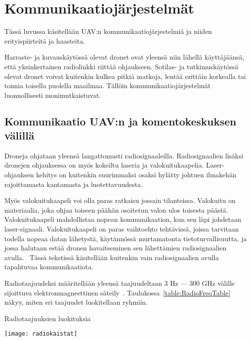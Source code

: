 \chapter{Kommunikaatiojärjestelmät}
\label{ch:kommunikaatio}

Tässä luvussa käsitellään UAV:n kommunikaatiojärjestelmiä ja niiden
erityispiirteitä ja haasteita.

Harraste- ja kuvauskäytössä olevat dronet ovat yleensä niin lähellä
käyttäjäänsä, että yksinkertainen radiolinkki riittää ohjaukseen. Sotilas- ja
tutkimuskäytössä olevat dronet voivat kuitenkin kulkea pitkiä matkoja, lentää
erittäin korkealla tai toimia toisella puolella maailmaa. Tällöin
kommunikaatiojärjestelmät luonnollisesti monimutkaistuvat.

\section{Kommunikaatio UAV:n ja komentokeskuksen välillä}

Droneja ohjataan yleensä langattomasti radiosignaaleilla. Radiosignaalien
lisäksi dronejen ohjauksessa on myös kokeiltu laseria ja valokuitukaapelia.
Laser-ohjauksen kehitys on kuitenkin suurimmaksi osaksi hylätty johtuen
ilmakehän rajoittamasta kantamasta ja luotettavuudesta.

Myös valokuitukaapeli voi olla paras ratkaisu jossain tilanteissa.  Valokuitu
on materiaalia, joka ohjaa toiseen päähän osoitetun valon ulos toisesta päästä.
Valokuitukaapeli mahdollistaa nopean kommunikaation, kun sen läpi johdetaan
laser-signaali.  Valokuitukaapeli on paras vaihtoehto tehtävissä, joissa
tarvitaan todella nopeaa datan lähetystä, käytännössä murtamatonta
tietoturvallisuutta, ja jossa halutaan estää dronen havaitseminen sen
lähettämien radiosignaalien avulla.~\cite{Austin2010} Tässä tekstissä
käsitellään kuitenkin vain radiosignaalien avulla tapahtuvaa kommunikaatiota.

Radiotaajuudeksi määritellään yleensä taajuudeltaan 3 Hz --- 300 GHz välille
sijoittuva elektronmagneettinen säteily~\cite{Sobot2012}.
Taulukossa~\ref{table:RadioFreqTable} näkyy, miten eri taajuudet luokitellaan
ryhmiin.
\begin{table}[H]
  \caption{Radiotaajuuksien luokituksia~\cite{Sobot2012}}
  \begin{center}
    \texttt{[image: radiokaistat]}
  \end{center}
\label{table:RadioFreqTable}
\end{table}

